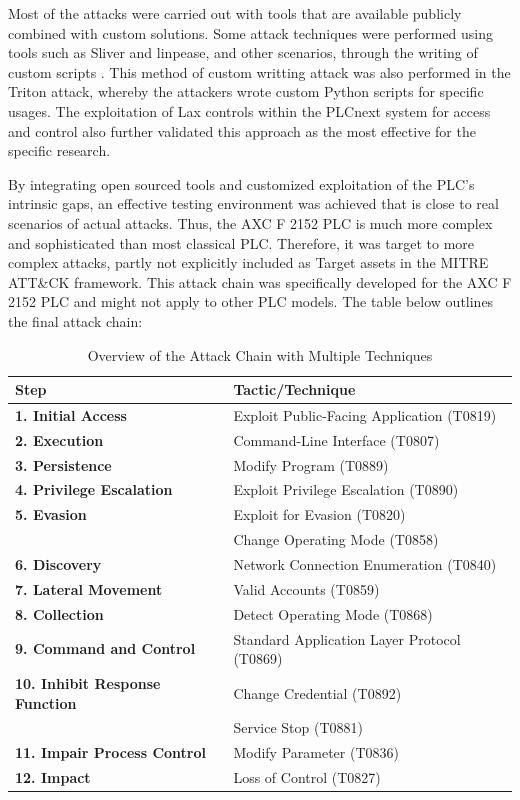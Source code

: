 \documentclass[Master,BMR,english]{twbook}
\begin{document}
Most of the attacks were carried out with tools that are available publicly combined with custom solutions. Some attack techniques were performed using tools such as Sliver and linpease, and other scenarios, through the writing of custom scripts \cite{sliver_getting_started_2024} \cite{plcnext_getting_started_2024} . This method of custom writting attack was also performed in the Triton attack, whereby the attackers wrote custom Python scripts for specific usages. The exploitation of Lax controls within the PLCnext system for access and control also further validated this approach as the most effective for the specific research.

By integrating open sourced tools and customized exploitation of the PLC's intrinsic gaps, an effective testing environment was achieved that is close to real scenarios of actual attacks. Thus, the AXC F 2152 PLC is much more complex and sophisticated than most classical PLC. Therefore, it was target to more complex attacks, partly not explicitly included as Target assets in the MITRE ATT\&CK framework. This attack chain was specifically developed for the AXC F 2152 PLC and might not apply to other PLC models. The table below outlines the final attack chain:

\begin{table}[!htbp]
\centering
\begin{tabular}{|l|l|}
\hline
\textbf{Step} & \textbf{Tactic/Technique} \\ \hline
\textbf{1. Initial Access} & Exploit Public-Facing Application (T0819) \\ \hline
\textbf{2. Execution} & Command-Line Interface (T0807) \\ \hline
\textbf{3. Persistence} & Modify Program (T0889) \\ \hline
\textbf{4. Privilege Escalation} & Exploit Privilege Escalation (T0890) \\ \hline
\textbf{5. Evasion} & Exploit for Evasion (T0820) \\ 
 & Change Operating Mode (T0858) \\ \hline
\textbf{6. Discovery} & Network Connection Enumeration (T0840) \\ \hline
\textbf{7. Lateral Movement} & Valid Accounts (T0859) \\ \hline
\textbf{8. Collection} & Detect Operating Mode (T0868) \\ \hline
\textbf{9. Command and Control} & Standard Application Layer Protocol (T0869) \\ \hline
\textbf{10. Inhibit Response Function} & Change Credential (T0892) \\ 
 & Service Stop (T0881) \\ \hline
\textbf{11. Impair Process Control} & Modify Parameter (T0836) \\ \hline
\textbf{12. Impact} & Loss of Control (T0827) \\ \hline
\end{tabular}
\caption{Overview of the Attack Chain with Multiple Techniques}
\label{tab:attack_chain_summary}
\end{table}
\end{document}
